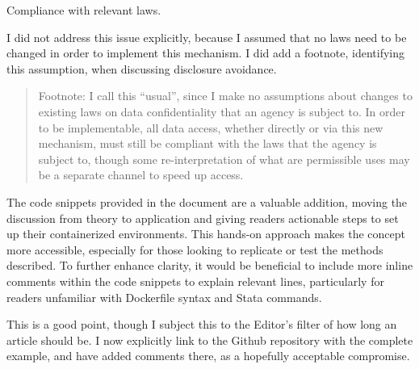 \begin{referee}

    Compliance with relevant laws.

\end{referee}

\begin{response}
    I did not address this issue explicitly, because I assumed that no laws need to be changed in order to implement this mechanism. I did add a footnote, identifying this assumption, when discussing disclosure avoidance.


    \begin{quote}
        Footnote: I call this ``usual'', since I make no assumptions about changes to existing laws on data confidentiality that an agency is subject to. In order to be implementable, all data access, whether directly or via this new mechanism, must still be compliant with the laws that the agency is subject to, though some re-interpretation of what are permissible uses may be a separate channel to speed up access.
        \end{quote}
\end{response}

\begin{referee}

    The code snippets provided in the document are a valuable addition, moving the discussion from theory to application and giving readers actionable steps to set up their containerized environments.  This hands-on approach makes the concept more accessible, especially for those looking to replicate or test the methods described.  To further enhance clarity, it would be beneficial to include more inline comments within the code snippets to explain relevant lines, particularly for readers unfamiliar with Dockerfile syntax and Stata commands. 
\end{referee}

\begin{response}
    This is a good point, though I subject this to the Editor's filter of how long an article should be. I now explicitly link to the Github repository with the complete example, and have added comments there, as a hopefully acceptable compromise.
\end{response}

